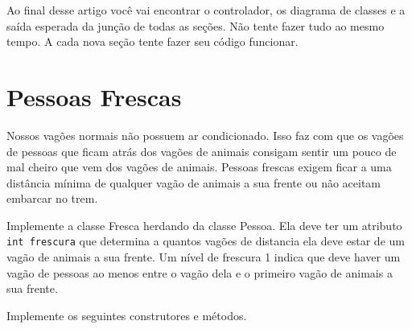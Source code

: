 \documentclass[12pt]{article}
\renewcommand{\tt}[1]{\lstinline|#1|}
\begin{document}
Ao final desse artigo você vai encontrar o controlador, os diagrama de classes e a saída esperada da junção de todas as seções. Não tente fazer tudo ao mesmo tempo. A cada nova seção tente fazer seu código funcionar.
\section{Pessoas Frescas}

Nossos vagões normais não possuem ar condicionado. Isso faz com que os vagões de pessoas que ficam
atrás dos vagões de animais consigam sentir um pouco de mal cheiro que vem dos vagões de animais.
Pessoas frescas exigem ficar a uma distância mínima de qualquer vagão de animais a sua frente
ou não aceitam embarcar no trem.

Implemente a classe Fresca herdando da classe Pessoa. Ela deve ter um atributo \tt{int frescura} que determina
a quantos vagões de distancia ela deve estar de um vagão de animais a sua frente. Um nível de frescura 1 indica que deve haver um vagão de pessoas ao menos entre o vagão dela e o primeiro vagão de animais a sua frente.

Implemente os seguintes construtores e métodos.
\end{document}

